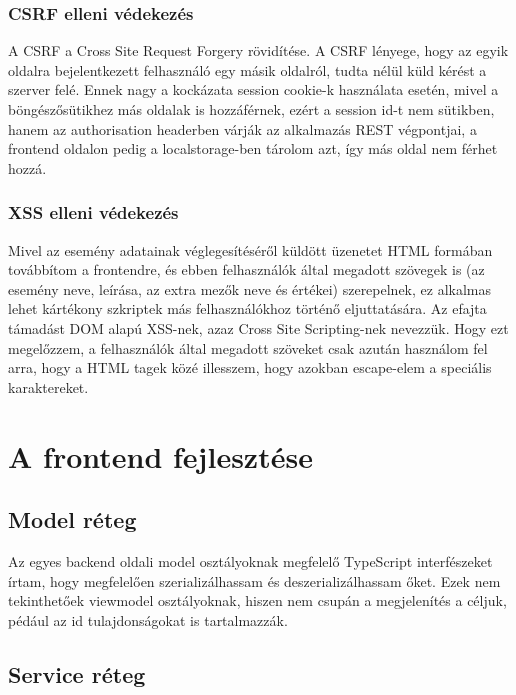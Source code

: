 \documentclass[a4paper,12pt]{report}
\theoremstyle{definition}
\theoremstyle{remark}
\begin{document}
	\subsection{CSRF elleni védekezés}

A CSRF a Cross Site Request Forgery rövidítése. A CSRF lényege, hogy az egyik oldalra bejelentkezett felhasználó egy másik oldalról, tudta nélül küld kérést a szerver felé\cite{Infbiztwebsite}. Ennek nagy a kockázata session cookie-k használata esetén, mivel a böngészősütikhez más oldalak is hozzáférnek, ezért a session id-t nem sütikben, hanem az authorisation headerben várják az alkalmazás REST végpontjai, a frontend oldalon pedig a localstorage-ben tárolom azt, így más oldal nem férhet hozzá.


	\subsection{XSS elleni védekezés}

Mivel az esemény adatainak véglegesítéséről küldött üzenetet HTML formában továbbítom a frontendre, és ebben felhasználók által megadott szövegek is (az esemény neve, leírása, az extra mezők neve és értékei) szerepelnek, ez alkalmas lehet kártékony szkriptek más felhasználókhoz történő eljuttatására. Az efajta támadást DOM alapú XSS-nek, azaz Cross Site Scripting-nek nevezzük\cite{Infbiztwebsite}. Hogy ezt megelőzzem, a felhasználók által megadott szöveket csak azután használom fel arra, hogy a HTML tagek közé illesszem, hogy azokban escape-elem a speciális karaktereket.

\chapter{A frontend fejlesztése}

\section{Model réteg}

Az egyes backend oldali model osztályoknak megfelelő TypeScript interfészeket írtam, hogy megfelelően szerializálhassam és deszerializálhassam őket. Ezek nem tekinthetőek viewmodel osztályoknak, hiszen nem csupán a megjelenítés a céljuk, pédául az id tulajdonságokat is tartalmazzák.

\section{Service réteg}
\end{document}
